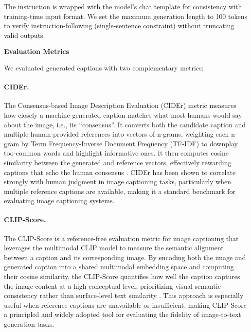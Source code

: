 The instruction is wrapped with the model's chat template for consistency with training-time input format. We set the maximum generation length to 100 tokens to verify instruction-following (single-sentence constraint) without truncating valid outputs.

\noindent\textbf{Evaluation Metrics}

We evaluated generated captions with two complementary metrics:

\paragraph{CIDEr.}
The Consensus-based Image Description Evaluation (CIDEr) metric \cite{vedantamCIDErConsensusbasedImage2015} measures how closely a machine-generated caption matches what most humans would say about the image, i.e.,  its ``consensus''. It converts both the candidate caption and multiple human-provided references into vectors of n-grams, weighting each n-gram by Term Frequency-Inverse Document Frequency (TF-IDF) to downplay too-common words and highlight informative ones. It then computes cosine similarity between the generated and reference vectors, effectively rewarding captions that echo the human consensus \cite{jeongTechnicalReportNICE2024}. CIDEr has been shown to correlate strongly with human judgment in image captioning tasks, particularly when multiple reference captions are available, making it a standard benchmark for evaluating image captioning systems.

\paragraph{CLIP-Score.}
The CLIP-Score \cite{hesselCLIPScoreReferencefreeEvaluation2022} is a reference-free evaluation metric for image captioning that leverages the multimodal CLIP model \cite{radfordLearningTransferableVisual2021} to measure the semantic alignment between a caption and its corresponding image. By encoding both the image and generated caption into a shared multimodal embedding space and computing their cosine similarity, the CLIP-Score quantifies how well the caption captures the image content at a high conceptual level, prioritizing visual-semantic consistency rather than surface-level text similarity \cite{hesselCLIPScoreReferencefreeEvaluation2022}. This approach is especially useful when reference captions are unavailable or insufficient, making CLIP-Score a principled and widely adopted tool for evaluating the fidelity of image-to-text generation tasks.

